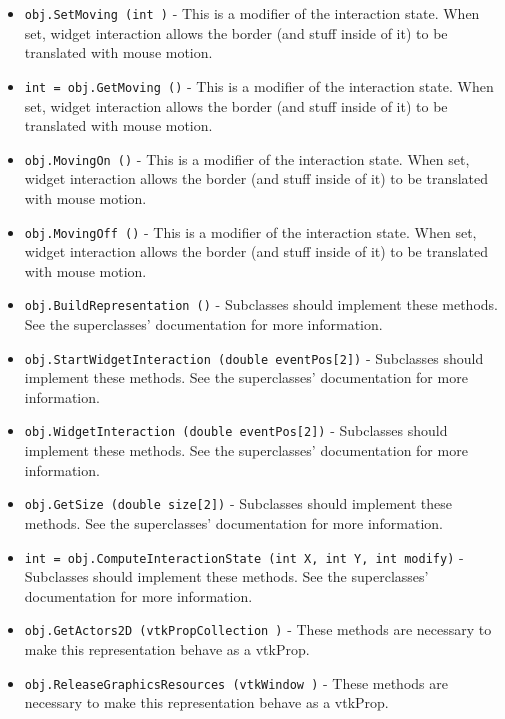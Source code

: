 \begin{itemize}
\item  \verb|obj.SetMoving (int )| -  This is a modifier of the interaction state. When set, widget interaction
 allows the border (and stuff inside of it) to be translated with mouse
 motion.

\item  \verb|int = obj.GetMoving ()| -  This is a modifier of the interaction state. When set, widget interaction
 allows the border (and stuff inside of it) to be translated with mouse
 motion.

\item  \verb|obj.MovingOn ()| -  This is a modifier of the interaction state. When set, widget interaction
 allows the border (and stuff inside of it) to be translated with mouse
 motion.

\item  \verb|obj.MovingOff ()| -  This is a modifier of the interaction state. When set, widget interaction
 allows the border (and stuff inside of it) to be translated with mouse
 motion.

\item  \verb|obj.BuildRepresentation ()| -  Subclasses should implement these methods. See the superclasses'
 documentation for more information.

\item  \verb|obj.StartWidgetInteraction (double eventPos[2])| -  Subclasses should implement these methods. See the superclasses'
 documentation for more information.

\item  \verb|obj.WidgetInteraction (double eventPos[2])| -  Subclasses should implement these methods. See the superclasses'
 documentation for more information.

\item  \verb|obj.GetSize (double size[2])| -  Subclasses should implement these methods. See the superclasses'
 documentation for more information.

\item  \verb|int = obj.ComputeInteractionState (int X, int Y, int modify)| -  Subclasses should implement these methods. See the superclasses'
 documentation for more information.

\item  \verb|obj.GetActors2D (vtkPropCollection )| -  These methods are necessary to make this representation behave as
 a vtkProp.

\item  \verb|obj.ReleaseGraphicsResources (vtkWindow )| -  These methods are necessary to make this representation behave as
 a vtkProp.


\end{itemize}
